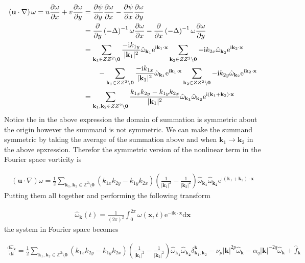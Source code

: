 \documentclass[9pt]{article}
\newcommand{\der}[2]{\frac{\mathrm{d}#1}{\mathrm{d}#2}}          	 %
\newcommand{\pder}[2]{\frac{\partial #1}{\partial #2}}               %
\newcommand{\ii}{\mathrm{i}}      								  %
\newcommand{\e}{\mathrm{e}}      								  %
\newcommand{\bfu}{\mathbf{u}}											%
\newcommand{\omegahat}[1]{\hat{\omega}_{ \mathbf{#1} } }								%
\newcommand{\bfx}{\mathbf{x}}								%
\newcommand{\bfk}{\mathbf{k}}								%
\newcommand{\bfkn}[1]{\mathbf{k}_{#1}}								%
\begin{document}
\begin{align}
\left(\bfu \cdot \nabla\right) \omega	= u\pder{\omega}{x} + v\pder{\omega}{y} &= \pder{\psi}{y}\pder{\omega}{x} - \pder{\psi}{x}\pder{\omega}{y} \notag \\
&= \pder{}{y}\left(-\Delta\right)^{-1}\omega\pder{\omega}{x} - \pder{}{x}\left(-\Delta\right)^{-1}\omega\pder{\omega}{y} \notag \\
&= \sum_{\mathbf{k}_1\in \mathbb{Z}^2\setminus \mathbf{0}} \frac{-\ii k_{1y}}{|\bfkn{1}|^2}\hat{\omega}_{\bfkn{1}} \e^{\ii \bfkn{1}\cdot \mathbf{x}} \sum_{\mathbf{k}_2\in \mathbb{Z}^2\setminus \mathbf{0}} -\ii k_{2x}\hat{\omega}_{\bfkn{2}} \e^{\ii \bfkn{2}\cdot \mathbf{x}} \notag\\
&\qquad - \sum_{\mathbf{k}_1\in \mathbb{Z}^2\setminus \mathbf{0}} \frac{-\ii k_{1x}}{|\bfkn{1}|^2}\hat{\omega}_{\bfkn{1}} \e^{\ii \bfkn{1}\cdot \mathbf{x}} \sum_{\mathbf{k}_2\in \mathbb{Z}^2\setminus \mathbf{0}} -\ii k_{2y}\hat{\omega}_{\bfkn{2}} \e^{\ii \bfkn{2}\cdot \mathbf{x}} \notag \\
&= \sum_{\mathbf{k}_1, \mathbf{k}_2\in \mathbb{Z}^2\setminus \mathbf{0}}\frac{k_{1x}k_{2y} - k_{1y}k_{2x}}{|\bfkn{1}|^2} \omegahat{\bfkn{1}}\omegahat{\bfkn{2}} \e^{\ii (\bfkn{1} + \bfkn{2}) \cdot \bfx}
\end{align}
Notice the in the above expression the domain of summation is symmetric about the origin however the summand is not symmetric. We can make the summand symmetric by taking the average of the summation above and when $\bfkn{1} \rightarrow \bfkn{2}$ in the above epxression. Therefor the symmetric version of the nonlinear term in the Fourier space vorticity is

\begin{align}
	\left(\bfu \cdot \nabla\right) \omega = \frac{1}{2} \sum_{\mathbf{k}_1, \mathbf{k}_2\in \mathbb{Z}^2\setminus \mathbf{0}}\left(k_{1x}k_{2y} - k_{1y}k_{2x}\right) \left(\frac{1}{|\bfkn{1}|^2} - \frac{1}{|\bfkn{2}|^2}\right) \omegahat{\bfkn{1}}\omegahat{\bfkn{2}} \e^{\ii (\bfkn{1} + \bfkn{2}) \cdot \bfx}
\end{align}
Putting them all together and performing the following transform

\begin{align}
	\omegahat{\bfk} (t)= \frac{1}{(2\pi)^2}\int_0^{2\pi}\omega(\bfx, t)\e^{-\ii \bfk \cdot \bfx}\mathrm{d}\mathbf{x}
\end{align}
the system in Fourier space becomes

\begin{align}
	\der{\omegahat{k}}{t} = \frac{1}{2}	\sum_{\mathbf{k}_1, \mathbf{k}_2\in \mathbb{Z}^2\setminus \mathbf{0}}\left(k_{1x}k_{2y} - k_{1y}k_{2x}\right) \left(\frac{1}{|\bfkn{1}|^2} - \frac{1}{|\bfkn{2}|^2}\right) \omegahat{\bfkn{1}}\omegahat{\bfkn{2}} \delta_{\bfkn{1}, \bfkn{2}}^{\bfk} -\nu_p |\bfk|^{2p}\omegahat{k} - \alpha_q|\bfk|^{-2q}\omegahat{k} + \hat{f}_{\bfk}
	\label{eq:vort_eqn_fourier_space}
\end{align}
\end{document}

